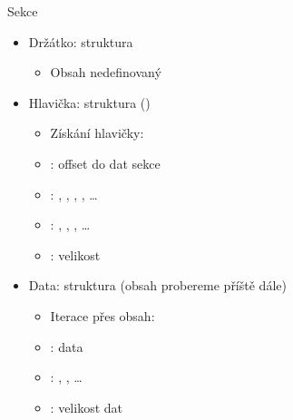 \begin{frame}{}{Sekce}

  \begin{itemize}
    \item Držátko: struktura 
    \begin{itemize}
      \item Obsah nedefinovaný
    \end{itemize}

    \pause

    \item Hlavička: struktura  ()
    \begin{itemize}
      \item Získání hlavičky:

      \pause

      \item {}: offset do dat sekce 
      \item {}: , ,
	, , \dots
      \item {}: , ,
	, \dots
      \item {}: velikost
    \end{itemize}

    \pause

    \item Data: struktura  (obsah probereme \iffimuni příště\else
      dále\fi)
    \begin{itemize}
      \item Iterace přes obsah:

      \pause

      \item {}: data
      \item {}: , , \dots
      \item {}: velikost dat
    \end{itemize}
  \end{itemize}

\end{frame}


